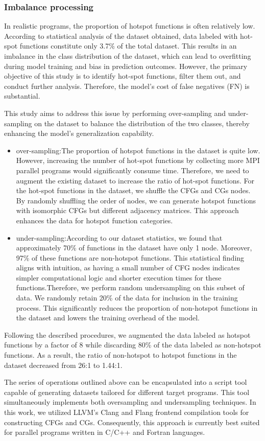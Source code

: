 \documentclass[lineno,sn-mathphys]{sn-jnl}%
\theoremstyle{thmstyleone}%
\theoremstyle{thmstyletwo}%
\theoremstyle{thmstylethree}%
\begin{document}
\subsubsection{Imbalance processing}
In realistic programs, the proportion of hotspot functions is often relatively low. According to statistical analysis of the dataset obtained, data labeled with hot-spot functions constitute only 3.7\% of the total dataset. This results in an imbalance in the class distribution of the dataset, which can lead to overfitting during model training and bias in prediction outcomes. However, the primary objective of this study is to identify hot-spot functions, filter them out, and conduct further analysis. Therefore, the model's cost of false negatives (FN) is substantial.\par
This study aims to address this issue by performing over-sampling and under-sampling on the dataset to balance the distribution of the two classes, thereby enhancing the model's generalization capability.\par
\begin{itemize}
    \item over-sampling:The proportion of hotspot functions in the dataset is quite low. However, increasing the number of hot-spot functions by collecting more MPI parallel programs would significantly consume time. Therefore, we need to augment the existing dataset to increase the ratio of hot-spot functions. For the hot-spot functions in the dataset, we shuffle the CFGs and CGs nodes. By randomly shuffling the order of nodes, we can generate hotspot functions with isomorphic CFGs but different adjacency matrices. This approach enhances the data for hotspot function categories.
    \item under-sampling:According to our dataset statistics, we found that approximately 70\% of functions in the dataset have only 1 node. Moreover, 97\% of these functions are non-hotspot functions. This statistical finding aligns with intuition, as having a small number of CFG nodes indicates simpler computational logic and shorter execution times for these functions.Therefore, we perform random undersampling on this subset of data. We randomly retain 20\% of the data for inclusion in the training process. This significantly reduces the proportion of non-hotspot functions in the dataset and lowers the training overhead of the model.
\end{itemize}\par
Following the described procedures, we augmented the data labeled as hotspot functions by a factor of 8 while discarding 80\% of the data labeled as non-hotspot functions. As a result, the ratio of non-hotspot to hotspot functions in the dataset decreased from 26:1 to 1.44:1.\par
The series of operations outlined above can be encapsulated into a script tool capable of generating datasets tailored for different target programs. This tool simultaneously implements both oversampling and undersampling techniques. In this work, we utilized LLVM's Clang and Flang frontend compilation tools for constructing CFGs and CGs. Consequently, this approach is currently best suited for parallel programs written in C/C++ and Fortran languages.
\end{document}
